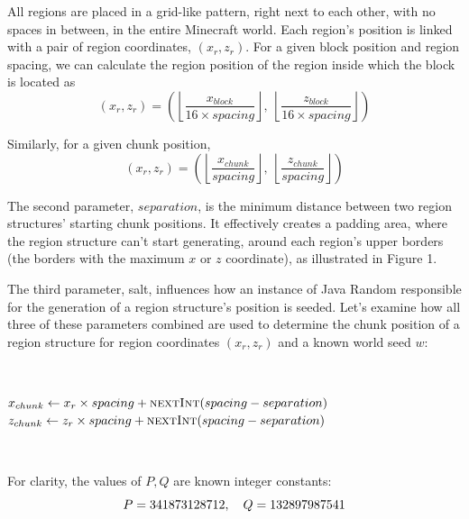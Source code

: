 \documentclass{article}
\begin{document}
All regions are placed in a grid-like pattern, right next to each other, with no spaces in between, in the entire Minecraft world. Each region's position is linked with a pair of region coordinates, $(x_r, z_r)$. For a given block position and region spacing, we can calculate the region position of the region inside which the block is located as
\begin{equation}
    (x_r, z_r) = \left( \left\lfloor \frac{x_{block}}{16 \times spacing} \right\rfloor,\ \left\lfloor \frac{z_{block}}{16 \times spacing} \right\rfloor \right)
\end{equation}

\noindent Similarly, for a given chunk position,
\begin{equation}
    (x_r, z_r) = \left( \left\lfloor \frac{x_{chunk}}{spacing} \right\rfloor,\ \left\lfloor \frac{z_{chunk}}{spacing} \right\rfloor \right)
\end{equation}

The second parameter, $separation$, is the minimum distance between two region structures' starting chunk positions. It effectively creates a padding area, where the region structure can't start generating, around each region's upper borders (the borders with the maximum $x$ or $z$ coordinate), as illustrated in Figure 1. %

The third parameter, salt, influences how an instance of Java Random responsible for the generation of a region structure's position is seeded. 
Let's examine how all three of these parameters combined are used to determine the chunk position of a region structure for region coordinates $(x_r, z_r)$ and a known world seed $w$:

\
\begin{algorithmic}
\State {}
\State $x_{chunk} \gets x_r \times spacing + \Call{nextInt}{spacing - separation}$
\State $z_{chunk} \gets z_r \times spacing + \Call{nextInt}{spacing - separation}$
\end{algorithmic}
\ \

\noindent For clarity, the values of $P, Q$ are known integer constants:
\begin{equation}\notag
    P = 341873128712, \quad Q = 132897987541
\end{equation}
\end{document}
